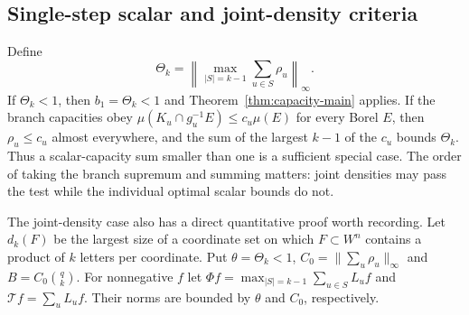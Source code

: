 \documentclass[11pt,reqno]{amsart}
\numberwithin{equation}{section}
\theoremstyle{definition}
\begin{document}
\subsection{Single-step scalar and joint-density criteria}
Define
\begin{equation}\label{eq:cap-Theta}
 \Theta_k=\left\|\max_{|S|=k-1}\sum_{u\in S}\rho_u\right\|_\infty.
\end{equation}
If $\Theta_k<1$, then $b_1=\Theta_k<1$ and
Theorem~\ref{thm:capacity-main} applies. If the branch capacities obey
$\mu(K_u\cap g_u^{-1}E)\le c_u\mu(E)$ for every Borel $E$,
then $\rho_u\le c_u$ almost everywhere, and the sum of the largest
$k-1$ of the $c_u$ bounds $\Theta_k$. Thus a scalar-capacity sum
smaller than one is a sufficient special case. The order of taking
the branch supremum and summing matters: joint densities may pass
the test while the individual optimal scalar bounds do not.

The joint-density case also has a direct quantitative proof worth
recording. Let $d_k(F)$ be the largest size of a coordinate set on
which $F\subset W^n$ contains a product of $k$ letters per coordinate.
Put $\theta=\Theta_k<1$, $C_0=\|\sum_u\rho_u\|_\infty$ and
$B=C_0\binom qk$. For nonnegative $f$ let
$\Phi f=\max_{|S|=k-1}\sum_{u\in S}L_uf$ and
$\mathcal Tf=\sum_uL_uf$. Their norms are bounded by $\theta$
and $C_0$, respectively.
\end{document}
